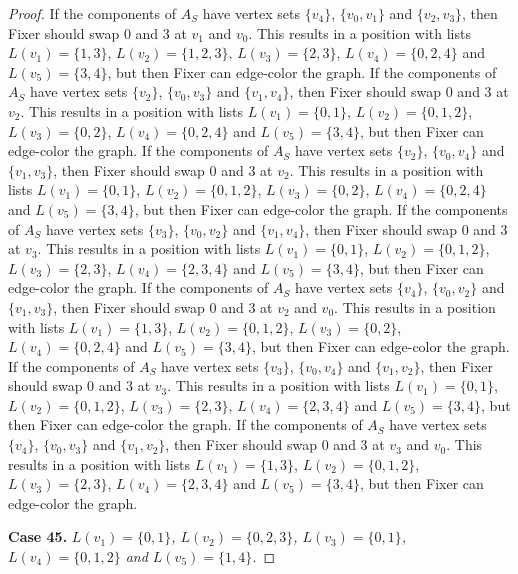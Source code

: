 \documentclass[12pt]{amsart}
\theoremstyle{plain}
\theoremstyle{definition}
\theoremstyle{remark}
\begin{document}
\begin{proof}
If the components of $A_S$ have vertex sets $\{v_4\}$, $\{v_0, v_1\}$ and $\{v_2, v_3\}$, then Fixer should swap 0 and 3 at $v_1$ and $v_0$. This results in a position with lists $L(v_1) = \{1, 3\}$, $L(v_2) = \{1, 2, 3\}$, $L(v_3) = \{2, 3\}$, $L(v_4) = \{0, 2, 4\}$ and $L(v_5) = \{3, 4\}$, but then Fixer can edge-color the graph.
If the components of $A_S$ have vertex sets $\{v_2\}$, $\{v_0, v_3\}$ and $\{v_1, v_4\}$, then Fixer should swap 0 and 3 at $v_2$. This results in a position with lists $L(v_1) = \{0, 1\}$, $L(v_2) = \{0, 1, 2\}$, $L(v_3) = \{0, 2\}$, $L(v_4) = \{0, 2, 4\}$ and $L(v_5) = \{3, 4\}$, but then Fixer can edge-color the graph.
If the components of $A_S$ have vertex sets $\{v_2\}$, $\{v_0, v_4\}$ and $\{v_1, v_3\}$, then Fixer should swap 0 and 3 at $v_2$. This results in a position with lists $L(v_1) = \{0, 1\}$, $L(v_2) = \{0, 1, 2\}$, $L(v_3) = \{0, 2\}$, $L(v_4) = \{0, 2, 4\}$ and $L(v_5) = \{3, 4\}$, but then Fixer can edge-color the graph.
If the components of $A_S$ have vertex sets $\{v_3\}$, $\{v_0, v_2\}$ and $\{v_1, v_4\}$, then Fixer should swap 0 and 3 at $v_3$. This results in a position with lists $L(v_1) = \{0, 1\}$, $L(v_2) = \{0, 1, 2\}$, $L(v_3) = \{2, 3\}$, $L(v_4) = \{2, 3, 4\}$ and $L(v_5) = \{3, 4\}$, but then Fixer can edge-color the graph.
If the components of $A_S$ have vertex sets $\{v_4\}$, $\{v_0, v_2\}$ and $\{v_1, v_3\}$, then Fixer should swap 0 and 3 at $v_2$ and $v_0$. This results in a position with lists $L(v_1) = \{1, 3\}$, $L(v_2) = \{0, 1, 2\}$, $L(v_3) = \{0, 2\}$, $L(v_4) = \{0, 2, 4\}$ and $L(v_5) = \{3, 4\}$, but then Fixer can edge-color the graph.
If the components of $A_S$ have vertex sets $\{v_3\}$, $\{v_0, v_4\}$ and $\{v_1, v_2\}$, then Fixer should swap 0 and 3 at $v_3$. This results in a position with lists $L(v_1) = \{0, 1\}$, $L(v_2) = \{0, 1, 2\}$, $L(v_3) = \{2, 3\}$, $L(v_4) = \{2, 3, 4\}$ and $L(v_5) = \{3, 4\}$, but then Fixer can edge-color the graph.
If the components of $A_S$ have vertex sets $\{v_4\}$, $\{v_0, v_3\}$ and $\{v_1, v_2\}$, then Fixer should swap 0 and 3 at $v_3$ and $v_0$. This results in a position with lists $L(v_1) = \{1, 3\}$, $L(v_2) = \{0, 1, 2\}$, $L(v_3) = \{2, 3\}$, $L(v_4) = \{2, 3, 4\}$ and $L(v_5) = \{3, 4\}$, but then Fixer can edge-color the graph.

\noindent\textbf{Case 45.  }\textit{$L(v_1) = \{0, 1\}$, $L(v_2) = \{0, 2, 3\}$, $L(v_3) = \{0, 1\}$, $L(v_4) = \{0, 1, 2\}$ and $L(v_5) = \{1, 4\}$.}


\end{proof}
\end{document}
